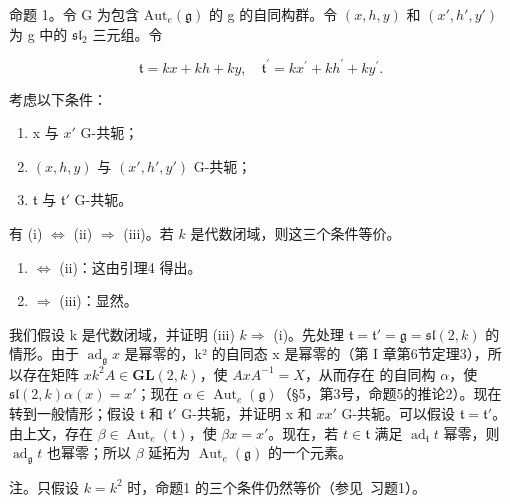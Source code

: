 命题 1。令 G 为包含 \(\mathrm{Aut}_e(\mathfrak{g})\) 的 g 的自同构群。令 \((x,h,y)\) 和 \((x',h',y')\) 为 g 中的 \(\mathfrak{sl}_2\) 三元组。令

\[
\mathfrak {t} = k x + k h + k y, \quad \mathfrak {t} ^ {\prime} = k x ^ {\prime} + k h ^ {\prime} + k y ^ {\prime}.
\]

考虑以下条件：

\begin{enumerate}
\def\labelenumi{(\roman{enumi})}
\item
  x 与 \(x'\) G-共轭；
\item
  \((x, h, y)\) 与 \((x', h', y')\) G-共轭；
\item
  \(\mathfrak{t}\) 与 \(\mathfrak{t}'\) G-共轭。
\end{enumerate}

有 (i) \(\Longleftrightarrow\) (ii) \(\Longrightarrow\) (iii)。若 \(k\) 是代数闭域，则这三个条件等价。

\begin{enumerate}
\def\labelenumi{(\roman{enumi})}
\item
  \(\Longleftrightarrow\) (ii)：这由引理4 得出。
\item
  \(\Longrightarrow\) (iii)：显然。
\end{enumerate}

我们假设 k 是代数闭域，并证明 (iii) \(k\)\(\Longrightarrow\) (i)。先处理 \(\mathfrak{t} = \mathfrak{t}' = \mathfrak{g} = \mathfrak{sl}(2, k)\) 的情形。由于 \(\operatorname{ad}_{\mathfrak{g}} x\) 是幂零的，k² 的自同态 x 是幂零的（第 I 章第6节定理3），所以存在矩阵 \(x\)\(k^2\)\(A \in \mathbf{GL}(2, k)\)，使 \(AxA^{-1} = X\)，从而存在  的自同构 \(\alpha\)，使 \(\mathfrak{sl}(2, k)\)\(\alpha(x) = x'\)；现在 \(\alpha \in \operatorname{Aut}_e(\mathfrak{g})\)（§5，第3号，命题5的推论2）。现在转到一般情形；假设 \(\mathfrak{t}\) 和 \(\mathfrak{t}'\) G-共轭，并证明 x 和 \(x\)\(x'\) G-共轭。可以假设 \(\mathfrak{t} = \mathfrak{t}'\)。由上文，存在 \(\beta \in \operatorname{Aut}_e(\mathfrak{t})\)，使 \(\beta x = x'\)。现在，若 \(t \in \mathfrak{t}\) 满足 \(\operatorname{ad}_{\mathfrak{t}} t\) 幂零，则 \(\operatorname{ad}_{\mathfrak{g}} t\) 也幂零；所以 \(\beta\) 延拓为 \(\operatorname{Aut}_e(\mathfrak{g})\) 的一个元素。

注。只假设 \(k = k^2\) 时，命题1 的三个条件仍然等价（参见~习题1）。

